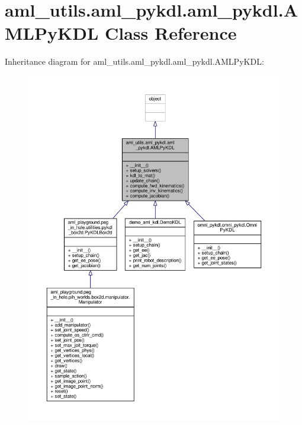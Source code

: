 \hypertarget{classaml__utils_1_1aml__pykdl_1_1aml__pykdl_1_1_a_m_l_py_k_d_l}{\section{aml\-\_\-utils.\-aml\-\_\-pykdl.\-aml\-\_\-pykdl.\-A\-M\-L\-Py\-K\-D\-L Class Reference}
\label{classaml__utils_1_1aml__pykdl_1_1aml__pykdl_1_1_a_m_l_py_k_d_l}
}


Inheritance diagram for aml\-\_\-utils.\-aml\-\_\-pykdl.\-aml\-\_\-pykdl.\-A\-M\-L\-Py\-K\-D\-L\-:
\nopagebreak
\begin{figure}[H]
\begin{center}
\leavevmode
\includegraphics[width=350pt]{classaml__utils_1_1aml__pykdl_1_1aml__pykdl_1_1_a_m_l_py_k_d_l__inherit__graph}
\end{center}
\end{figure}


